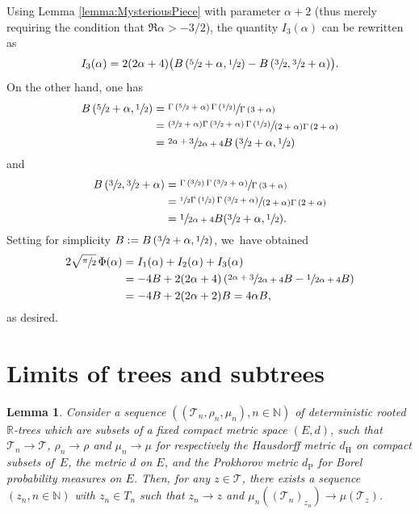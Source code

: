 \documentclass[11pt]{article}
\newcommand{\R}{{\mathbb{R}}}
\newcommand{\N}{\mathbb{N}}
\newcommand{\T}{\mathcal{T}}\let\CRT\T\let\tbr\T
\newtheorem{lem}[thm]{Lemma}
\theoremstyle{definition}
\begin{document}
Using Lemma \ref{lemma:MysteriousPiece} with parameter $\alpha+2$ (thus merely requiring the condition that $\Re \alpha > -3/2$), the quantity $I_3(\alpha)$ can be rewritten as
\[
I_3(\alpha) = 2(2\alpha+4) \bigl(B\left(\sfrac{5}{2}+\alpha, \sfrac{1}{2} \right) -B\left(\sfrac{3}{2}, \sfrac{3}{2}+\alpha\right) \bigr).
\]
On the other hand, one has
\begin{align*}
B\left(\sfrac{5}{2}+\alpha, \sfrac{1}{2} \right) &= \sfrac{\Gamma\left(\sfrac{5}{2}+\alpha\right) \Gamma\left(\sfrac{1}{2} \right)}{\Gamma\left(3+\alpha\right)} \\
&= \sfrac{(\sfrac{3}{2}+\alpha) \Gamma\left(\sfrac{3}{2}+\alpha\right) \Gamma\left(\sfrac{1}{2} \right)}{(2+\alpha) \Gamma\left(2+\alpha\right)}\\
&= \sfrac{2\alpha+3}{2\alpha+4} B\left(\sfrac{3}{2}+\alpha, \sfrac{1}{2} \right)
\end{align*}
and
\begin{align*}
B\left(\sfrac{3}{2}, \sfrac{3}{2}+\alpha \right) &= \sfrac{\Gamma\left(\sfrac{3}{2} \right) \Gamma\left(\sfrac{3}{2}+\alpha \right)}{\Gamma\left(3+\alpha \right)} \\
&= \sfrac{\sfrac{1}{2}\Gamma\left(\sfrac{1}{2} \right) \Gamma\left(\sfrac{3}{2}+\alpha \right)}{(2+\alpha)\Gamma\left(2+\alpha \right)}\\
&= \sfrac{1}{2\alpha+4} B(\sfrac{3}{2}+\alpha, \sfrac{1}{2}).
\end{align*}
Setting for simplicity $B:=B\left(\sfrac{3}{2}+\alpha, \sfrac{1}{2} \right)$, we~have obtained
\begin{align*}
2\sqrt{\sfrac{\pi}{2}}\,\Phi(\alpha) &= I_1(\alpha) + I_2(\alpha) + I_3(\alpha)\\
&= -4B + 2(2\alpha+4)\left(\sfrac{2\alpha+3}{2\alpha+4}B-\sfrac{1}{2\alpha+4} B \right)\\
&=-4B + 2(2\alpha+2)B =4\alpha B,
\end{align*}
as desired.

\section{Limits of trees and subtrees}

\begin{lem}\label{lemma:annoyingmetricthing}
Consider a sequence $((\T_n,\rho_n,\mu_n),n\in\N)$ of deterministic rooted $\R$\nobreakdash-trees which are subsets of a fixed compact metric space $(E,d)$, such that $\T_n\to \T$, $\rho_n\to \rho$ and $\mu_n\to\mu$ for respectively the Hausdorff metric $d_{\mathrm{H}}$ on compact subsets of~$E$, the metric $d$ on $E$, and the Prokhorov metric $d_{\mathrm{P}}$ for Borel probability measures on $E$.
Then, for any $z\in\T$, there exists a sequence $(z_n,n\in\N)$ with $z_n\in T_n$ such that $z_n\to z$ and $\mu_n((\T_n)_{z_n}) \to \mu(\T_z)$.
\end{lem}
\end{document}
